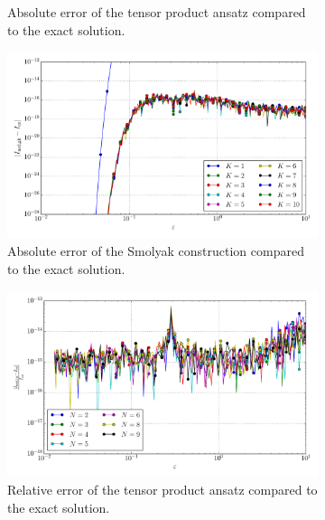 \documentclass[a4paper,10pt]{article}
\begin{document}
\begin{figure}[ht!]
\begin{subfigure}[t]{0.5\linewidth}
    \caption{Absolute error of the tensor product ansatz compared to the exact solution.}
    \label{fig:tp_sg_3d_conv_p_110_011_err_nsd_tp}
  \end{subfigure}
  \begin{subfigure}[t]{0.5\linewidth}
    \includegraphics[width=\linewidth]{./plots/tp_sg_3d_conv_eps_(1,1,0)_(0,1,1)_err_nsd_gk.pdf}
    \caption{Absolute error of the Smolyak construction compared to the exact solution.}
    \label{fig:tp_sg_3d_conv_p_110_011_err_nsd_gk}
  \end{subfigure}
  \begin{subfigure}[t]{0.5\linewidth}
    \includegraphics[width=\linewidth]{./plots/tp_sg_3d_conv_eps_(1,1,0)_(0,1,1)_err_rel_nsd_tp.pdf}
    \caption{Relative error of the tensor product ansatz compared to the exact solution.}
    \label{fig:tp_sg_3d_conv_p_110_011_err_rel_nsd_tp}
  \end{subfigure}
  \begin{subfigure}[t]{0.5\linewidth}

\end{subfigure}
\end{figure}
\end{document}
